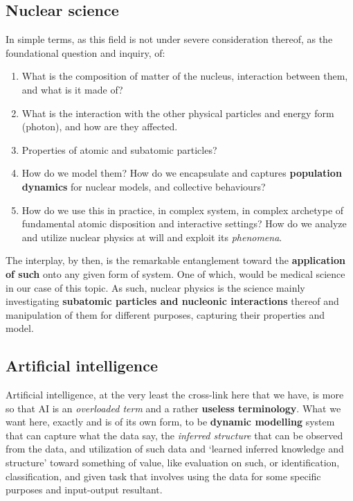 \documentclass[9pt,a4paper]{article}
\begin{document}
\subsection{Nuclear science}

In simple terms, as this field is not under severe consideration thereof, as the foundational question and inquiry, of:
\begin{enumerate}[itemsep=1pt,topsep=1pt]
    \item What is the composition of matter of the nucleus, interaction between them, and what is it made of? 
    \item What is the interaction with the other physical particles and energy form (photon), and how are they affected. 
    \item Properties of atomic and subatomic particles? 
    \item How do we model them? How do we encapsulate and captures \textbf{population dynamics} for nuclear models, and collective behaviours? 
    \item How do we use this in practice, in complex system, in complex archetype of fundamental atomic disposition and interactive settings? How do we analyze and utilize nuclear physics at will and exploit its \textit{phenomena}. 
\end{enumerate}

The interplay, by then, is the remarkable entanglement toward the \textbf{application of such} onto any given form of system. One of which, would be medical science in our case of this topic. As such, nuclear physics is the science mainly investigating \textbf{subatomic particles and nucleonic interactions} thereof and manipulation of them for different purposes, capturing their properties and model.

\subsection{Artificial intelligence}

Artificial intelligence, at the very least the cross-link here that we have, is more so that AI is an \textit{overloaded term} and a rather \textbf{useless terminology}. What we want here, exactly and is of its own form, to be \textbf{dynamic modelling} system that can capture what the data say, the \textit{inferred structure} that can be observed from the data, and utilization of such data and `learned inferred knowledge and structure' toward something of value, like evaluation on such, or identification, classification, and given task that involves using the data for some specific purposes and input-output resultant. 
\end{document}
